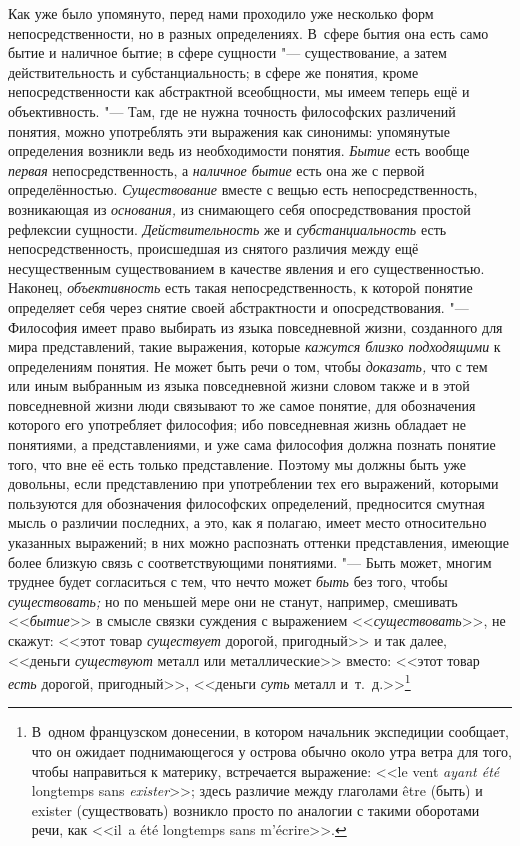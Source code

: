 Как уже было упомянуто, перед нами проходило уже несколько
форм непосредственности, но в разных определениях. В~сфере бытия она есть
само бытие и наличное бытие; в сфере сущности
"--- существование, а затем действительность и
субстанциальность; в сфере же понятия, кроме непосредственности как
абстрактной всеобщности, мы имеем теперь ещё и объективность. "---
Там, где не нужна точность философских различений понятия,
можно употреблять эти выражения как синонимы: упомянутые определения
возникли ведь из необходимости понятия. {\em Бытие} есть вообще
{\em первая} непосредственность, а {\em наличное бытие} есть
она же с первой определённостью. {\em Существование}
вместе с вещью есть непосредственность, возникающая из {\em основания,} из
снимающего себя опосредствования простой рефлексии сущности.
{\em Действительность} же и {\em субстанциальность}
есть непосредственность, происшедшая из снятого различия
между ещё несущественным существованием в качестве явления и его
существенностью. Наконец, {\em объективность} есть
такая непосредственность, к которой понятие определяет себя через снятие
своей абстрактности и опосредствования. "--- Философия имеет
право выбирать из языка повседневной жизни, созданного для мира
представлений, такие выражения, которые {\em кажутся близко подходящими}
к определениям понятия. Не может быть речи о том, чтобы {\em доказать,} что
с тем или иным выбранным из языка повседневной жизни словом также и в этой
повседневной жизни люди связывают то же самое понятие, для обозначения
которого его употребляет философия; ибо повседневная жизнь
обладает не понятиями, а представлениями, и уже сама философия должна
познать понятие того, что вне её есть только представление. Поэтому мы
должны быть уже довольны, если представлению при употреблении тех его
выражений, которыми пользуются для обозначения философских определений,
предносится смутная мысль о различии последних, а это, как я полагаю, имеет
место относительно указанных выражений; в них можно распознать оттенки
представления, имеющие более близкую связь с соответствующими понятиями. "---
Быть может, многим труднее будет согласиться с тем, что нечто
может {\em быть} без того, чтобы {\em существовать;}
но по меньшей мере они не станут, например, смешивать <<{\em бытие}>>
в смысле связки суждения с выражением <<{\em существовать}>>, не
скажут: <<этот товар {\em существует}
дорогой, пригодный>> и так далее, <<деньги {\em существуют} металл
или металлические>> вместо: <<этот товар {\em есть} дорогой,
пригодный>>, <<деньги {\em суть} металл и~т.~д.>>\footnote{В~одном
французском донесении, в котором начальник экспедиции
сообщает, что он ожидает поднимающегося у острова обычно около утра ветра
для того, чтобы направиться к материку, встречается выражение: <<le vent
{\em ayant été} longtemps sans
{\em exister}>>\label{bkm:bm64};
здесь различие между глаголами être (быть) и
exister (существовать) возникло просто по аналогии с такими
оборотами речи, как <<il~a été longtemps sans
m'écrire>>.}
